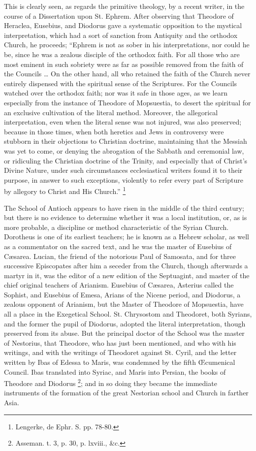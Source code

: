 This is clearly seen, as regards the primitive theology, by a
recent writer, in the course of a Dissertation upon St. Ephrem. After
observing that Theodore of Heraclea, Eusebius, and Diodorus gave a
systematic opposition to the mystical interpretation, which had a sort
of sanction from Antiquity and the orthodox Church, he proceeds;
``Ephrem is not as sober in his interpretations, nor could he be,
since he was a zealous disciple of the orthodox faith. For all those
who are most eminent in such sobriety were as far as possible removed
from the faith of the Councils … On the other hand, all who retained
the faith of the Church never entirely dispensed with the spiritual
sense of the Scriptures. For the Councils watched over the orthodox
faith; nor was it safe in those ages, as we learn especially from the
instance of Theodore of Mopsuestia, to desert the spiritual for an
exclusive cultivation of the literal method. Moreover, the allegorical
interpretation, even when the literal sense was not injured, was also preserved; because in those times, when both heretics and Jews in
controversy were stubborn in their objections to Christian doctrine,
maintaining that the Messiah was yet to come, or denying the
abrogation of the Sabbath and ceremonial law, or ridiculing the
Christian doctrine of the Trinity, and especially that of Christ's
Divine Nature, under such circumstances ecclesiastical writers found
it to their purpose, in answer to such exceptions, violently to refer
every part of Scripture by allegory to Christ and His Church.'' \footnote{Lengerke, de Ephr. S. pp. 78-80.}

The School of Antioch appears to have risen in the middle of the
third century; but there is no evidence to determine whether it was a
local institution, or, as is more probable, a discipline or method
characteristic of the Syrian Church. Dorotheus is one of its earliest
teachers; he is known as a Hebrew scholar, as well as a commentator on
the sacred text, and he was the master of Eusebius of Cæsarea.
Lucian, the friend of the notorious Paul of Samosata, and for three
successive Episcopates after him a seceder from the Church, though
afterwards a martyr in it, was the editor of a new edition of the
Septuagint, and master of the chief original teachers of Arianism.
Eusebius of Cæsarea, Asterius called the Sophist, and Eusebius of
Emesa, Arians of the Nicene period, and Diodorus, a zealous opponent
of Arianism, but the Master of Theodore of Mopsuestia, have all a
place in the Exegetical School. St. Chrysostom and Theodoret, both
Syrians, and the former the pupil of Diodorus, adopted the literal
interpretation, though preserved from its abuse. But the principal
doctor of the School was the master of Nestorius, that Theodore, who
has just been mentioned, and who with his writings, and with the
writings of Theodoret against St. Cyril, and the letter written by
Ibas of Edessa to Maris, was condemned by the fifth Œcumenical
Council. Ibas translated into Syriac, and Maris into Persian, the
books of Theodore and Diodorus \footnote{Asseman. t. 3, p. 30, p. lxviii., \&c.}; and in so doing they became the immediate instruments of the
formation of the great Nestorian school and Church in farther Asia.

